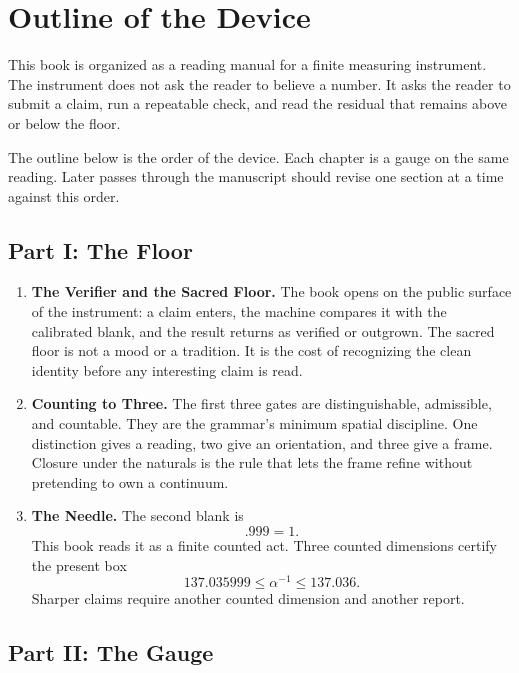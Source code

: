 \chapter*{Outline of the Device}

This book is organized as a reading manual for a finite measuring
instrument. The instrument does not ask the reader to believe a number. It
asks the reader to submit a claim, run a repeatable check, and read the
residual that remains above or below the floor.

The outline below is the order of the device. Each chapter is a gauge on the
same reading. Later passes through the manuscript should revise one section at
a time against this order.

\section*{Part I: The Floor}

\begin{enumerate}
\item \textbf{The Verifier and the Sacred Floor.}
The book opens on the public surface of the instrument: a claim enters, the
machine compares it with the calibrated blank, and the result returns as
verified or outgrown. The sacred floor is not a mood or a tradition. It is the
cost of recognizing the clean identity before any interesting claim is read.

\item \textbf{Counting to Three.}
The first three gates are distinguishable, admissible, and countable. They are
the grammar's minimum spatial discipline. One distinction gives a reading, two
give an orientation, and three give a frame. Closure under the naturals is the
rule that lets the frame refine without pretending to own a continuum.

\item \textbf{The Needle.}
The second blank is
\[
.999 = 1 .
\]
This book reads it as a finite counted act. Three counted dimensions certify
the present box
\[
137.035999 \leq \alpha^{-1} \leq 137.036 .
\]
Sharper claims require another counted dimension and another report.
\end{enumerate}

\section*{Part II: The Gauge}

